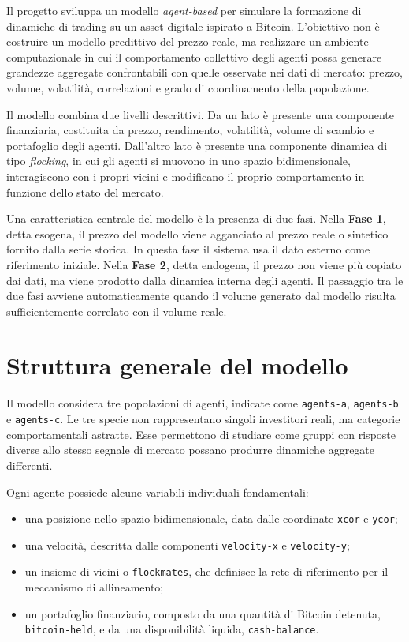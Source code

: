\noindent
Il progetto sviluppa un modello \textit{agent-based} per simulare la formazione
di dinamiche di trading su un asset digitale ispirato a Bitcoin. L'obiettivo non
è costruire un modello predittivo del prezzo reale, ma realizzare un ambiente
computazionale in cui il comportamento collettivo degli agenti possa generare
grandezze aggregate confrontabili con quelle osservate nei dati di mercato:
prezzo, volume, volatilità, correlazioni e grado di coordinamento della
popolazione.

Il modello combina due livelli descrittivi. Da un lato è presente una componente
finanziaria, costituita da prezzo, rendimento, volatilità, volume di scambio e
portafoglio degli agenti. Dall'altro lato è presente una componente dinamica di
tipo \textit{flocking}, in cui gli agenti si muovono in uno spazio bidimensionale,
interagiscono con i propri vicini e modificano il proprio comportamento in
funzione dello stato del mercato.

Una caratteristica centrale del modello è la presenza di due fasi. Nella
\textbf{Fase 1}, detta esogena, il prezzo del modello viene agganciato al prezzo
reale o sintetico fornito dalla serie storica. In questa fase il sistema usa il
dato esterno come riferimento iniziale. Nella \textbf{Fase 2}, detta endogena, il
prezzo non viene più copiato dai dati, ma viene prodotto dalla dinamica interna
degli agenti. Il passaggio tra le due fasi avviene automaticamente quando il
volume generato dal modello risulta sufficientemente correlato con il volume
reale.

\section{Struttura generale del modello}

Il modello considera tre popolazioni di agenti, indicate come \texttt{agents-a},
\texttt{agents-b} e \texttt{agents-c}. Le tre specie non rappresentano singoli
investitori reali, ma categorie comportamentali astratte. Esse permettono di
studiare come gruppi con risposte diverse allo stesso segnale di mercato possano
produrre dinamiche aggregate differenti.

Ogni agente possiede alcune variabili individuali fondamentali:
\begin{itemize}
    \item una posizione nello spazio bidimensionale, data dalle coordinate
    \texttt{xcor} e \texttt{ycor};
    \item una velocità, descritta dalle componenti \texttt{velocity-x} e
    \texttt{velocity-y};
    \item un insieme di vicini o \texttt{flockmates}, che definisce la rete di
    riferimento per il meccanismo di allineamento;
    \item un portafoglio finanziario, composto da una quantità di Bitcoin
    detenuta, \texttt{bitcoin-held}, e da una disponibilità liquida,
    \texttt{cash-balance}.
\end{itemize}


